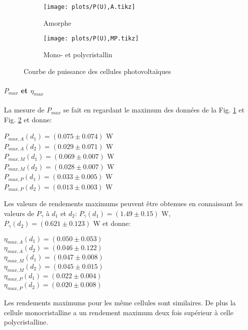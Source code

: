 \begin{figure}
    \centering
    \begin{subfigure}[c]{0.4\linewidth}
        \centering
        \texttt{[image: plots/P(U),A.tikz]}
        \caption{Amorphe}
        \label{plot:3a}        
    \end{subfigure}
    \begin{subfigure}[c]{0.4\linewidth}
        \centering
        \texttt{[image: plots/P(U),MP.tikz]}
        \caption{Mono- et polycristallin}
        \label{plot:3b}        
    \end{subfigure}
    \caption{Courbe de puissance des cellules photovoltaïques}
    \label{plot:3}
\end{figure}

\paragraph*{\(P_{max}\) et \(\eta_{max}\)}
La mesure de \(P_{max}\) se fait en regardant le maximum des données de la Fig. \ref{plot:3a} et Fig. \ref{plot:3b} et donne:
\begin{center}
    \(P_{max,A} (d_1) =  (0.075 \pm 0.074)\) \unit{\watt} \\
    \(P_{max,A} (d_2) =  (0.029 \pm 0.071)\) \unit{\watt} \\
    \(P_{max,M} (d_1) =  (0.069 \pm 0.007)\) \unit{\watt} \\
    \(P_{max,M} (d_2) =  (0.028 \pm 0.007)\) \unit{\watt} \\
    \(P_{max,P} (d_1) =  (0.033 \pm 0.005)\) \unit{\watt} \\
    \(P_{max,P} (d_2) =  (0.013 \pm 0.003)\) \unit{\watt}
\end{center}
Les valeurs de rendements maximums peuvent être obtenues en connaissant les valeurs de \(P_\gamma\) à \(d_1\) et \(d_2\): \(P_\gamma (d_1) = (1.49 \pm 0.15)\) \unit{\watt}, \(P_\gamma (d_2) = (0.621 \pm 0.123)\) \unit{\watt} et donne:
\begin{center}
    \(\eta_{max,A} (d_1) = (0.050 \pm 0.053)\) \\
    \(\eta_{max,A} (d_2) = (0.046 \pm 0.122)\) \\
    \(\eta_{max,M} (d_1) = (0.047 \pm 0.008)\) \\
    \(\eta_{max,M} (d_2) = (0.045 \pm 0.015)\) \\
    \(\eta_{max,P} (d_1) = (0.022 \pm 0.004)\) \\
    \(\eta_{max,P} (d_2) = (0.020 \pm 0.008)\)
\end{center}
Les rendements maximums pour les même cellules sont similaires. De plus la cellule monocristalline a un rendement maximum deux fois supérieur à celle polycristalline.

